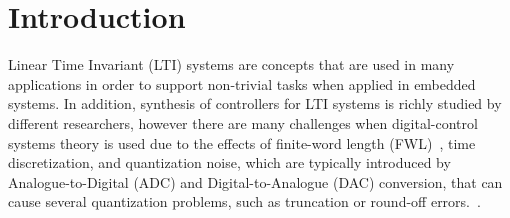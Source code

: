 \documentclass[sigconf]{acmart}
\begin{document}

\maketitle

\section{Introduction}



Linear Time Invariant (LTI) systems are concepts that are used in many applications in order to support non-trivial tasks when applied in embedded systems. In addition, synthesis of controllers for LTI systems is richly studied by different researchers, however there are many challenges when digital-control systems theory is used due to the effects of finite-word length (FWL)~\cite{Guang2013, Istepanian2001}, time discretization, and quantization noise, which are typically introduced by Analogue-to-Digital (ADC) and Digital-to-Analogue (DAC) conversion, that can cause several quantization problems, such as truncation or round-off errors.~\cite{astrom1997computer}. 
\end{document}
